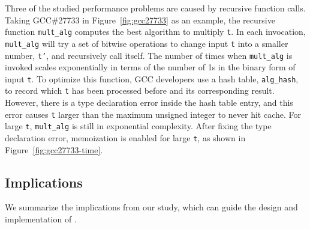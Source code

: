 Three of the studied performance problems are caused by recursive function calls. 
Taking GCC\#27733 in Figure~\ref{fig:gcc27733} as an example, 
the recursive function \texttt{mult\_alg} computes the best algorithm to multiply \texttt{t}.
In each invocation, \texttt{mult\_alg} will try a set of bitwise 
operations to change input 
\texttt{t} into a smaller number, \texttt{t'}, 
and recursively call itself.
The number of times when \texttt{mult\_alg} is invoked scales exponentially 
in terms of the number of 1s in the binary form of input \texttt{t}.
To optimize this function, 
GCC developers use a hash table, \texttt{alg\_hash}, to record
which \texttt{t} has been processed before and its corresponding result.
However, there is a type declaration error inside the hash table entry,
and this error causes \texttt{t} larger than the maximum unsigned integer to never hit cache.
For large \texttt{t}, \texttt{mult\_alg} is still in exponential complexity. 
After fixing the type declaration error, 
memoization is enabled for large \texttt{t}, 
as shown in Figure~\ref{fig:gcc27733-time}.


 
\subsection{Implications}
\label{sec:study_impli}

We summarize the implications from our study, which can guide
the design and implementation of \Tool.

